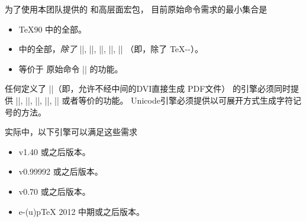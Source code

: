 \documentclass[full]{l3doc}
\begin{document}
%
为了使用本团队提供的  和高层面宏包，
目前原始命令需求的最小集合是
\begin{itemize}
    \item \TeX90 中的全部。
    \item \eTeX{} 中的全部，\emph{除了} |\TeXXeTstate|, |\beginL|, |\beginR|, |\endL|, |\endR|
    （即，除了 \TeX{}-\kern0pt-）。
    \item 等价于 \pdfTeX{} 原始命令 |\pdfstrcmp| 的功能。
\end{itemize}
任何定义了 |\pdfoutput|（即，允许不经中间的DVI直接生成 PDF文件）
的引擎必须同时提供 |\pdfcolorstack|, |\pdfliteral|, |\pdfmatrix|, |\pdfrestore|, |\pdfsave| 或者等价的功能。
Unicode引擎必须提供以可展开方式生成字符记号的方法。

%
实际中，以下引擎可以满足这些需求
\begin{itemize}
    \item \pdfTeX{} v1.40 或之后版本。
    \item \XeTeX{} v0.99992 或之后版本。
    \item \LuaTeX{} v0.70 或之后版本。
    \item e-(u)p\TeX{} 2012 中期或之后版本。
\end{itemize}
\end{document}
